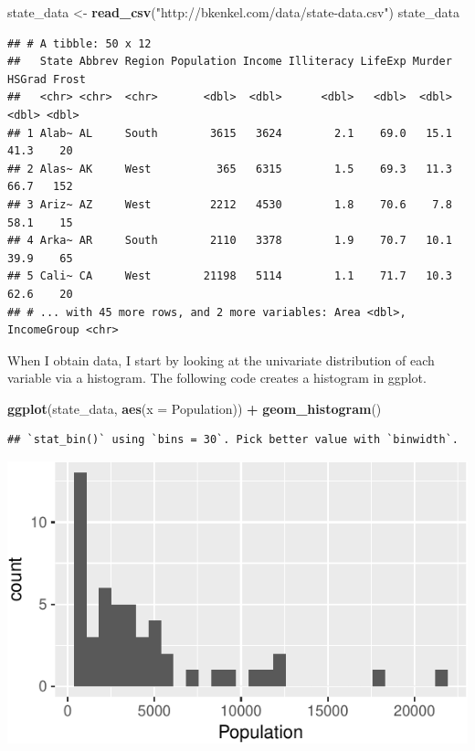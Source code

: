 \documentclass[
  12pt,
  oneside,openany]{book}
\newenvironment{Shaded}{\begin{snugshade}}{\end{snugshade}}
\newcommand{\DataTypeTok}[1]{\textcolor[rgb]{0.13,0.29,0.53}{#1}}
\newcommand{\KeywordTok}[1]{\textcolor[rgb]{0.13,0.29,0.53}{\textbf{#1}}}
\newcommand{\NormalTok}[1]{#1}
\newcommand{\OperatorTok}[1]{\textcolor[rgb]{0.81,0.36,0.00}{\textbf{#1}}}
\newcommand{\StringTok}[1]{\textcolor[rgb]{0.31,0.60,0.02}{#1}}
\begin{document}
\begin{Shaded}
\begin{Highlighting}[]
\NormalTok{state\_data <{-}}\StringTok{ }\KeywordTok{read\_csv}\NormalTok{(}\StringTok{"http://bkenkel.com/data/state{-}data.csv"}\NormalTok{)}
\NormalTok{state\_data}
\end{Highlighting}
\end{Shaded}

\begin{verbatim}
## # A tibble: 50 x 12
##   State Abbrev Region Population Income Illiteracy LifeExp Murder HSGrad Frost
##   <chr> <chr>  <chr>       <dbl>  <dbl>      <dbl>   <dbl>  <dbl>  <dbl> <dbl>
## 1 Alab~ AL     South        3615   3624        2.1    69.0   15.1   41.3    20
## 2 Alas~ AK     West          365   6315        1.5    69.3   11.3   66.7   152
## 3 Ariz~ AZ     West         2212   4530        1.8    70.6    7.8   58.1    15
## 4 Arka~ AR     South        2110   3378        1.9    70.7   10.1   39.9    65
## 5 Cali~ CA     West        21198   5114        1.1    71.7   10.3   62.6    20
## # ... with 45 more rows, and 2 more variables: Area <dbl>, IncomeGroup <chr>
\end{verbatim}

When I obtain data, I start by looking at the univariate distribution of each variable via a histogram. The following code creates a histogram in ggplot.

\begin{Shaded}
\begin{Highlighting}[]
\KeywordTok{ggplot}\NormalTok{(state\_data, }\KeywordTok{aes}\NormalTok{(}\DataTypeTok{x =}\NormalTok{ Population)) }\OperatorTok{+}
\StringTok{  }\KeywordTok{geom\_histogram}\NormalTok{()}
\end{Highlighting}
\end{Shaded}

\begin{verbatim}
## `stat_bin()` using `bins = 30`. Pick better value with `binwidth`.
\end{verbatim}

\includegraphics{pdaps_files/figure-latex/histogram-1.pdf}
\end{document}
